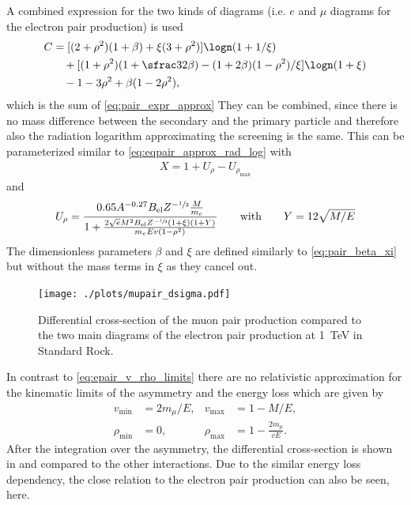 A combined expression for the two kinds of diagrams (i.e. $e$ and $\mu$ diagrams for the electron pair production) is used
\begin{align}
    C &= [(2 + \rho^2)(1 + \beta) + \xi(3 + \rho^2)] \logn (1 + 1/\xi) \\
        & \quad + [(1 + \rho^2)(1 + \sfrac32 \beta) - (1 + 2\beta)(1 - \rho^2)/\xi] \logn(1 + \xi) \\
        & \quad - 1 - 3\rho^2 + \beta(1 - 2\rho^2) ,
\end{align}
which is the sum of \eqref{eq:pair_expr_approx}
They can be combined, since there is no mass difference between the secondary and the primary particle and therefore also the radiation logarithm approximating the screening is the same.
This can be parameterized similar to \eqref{eq:eqpair_approx_rad_log} with
\begin{align}
    X = 1 + U_{\rho} - U_{\rho_{\text{max}}}
\end{align}
and
\begin{align}
    U_\rho = \frac{0.65 A^{-0.27} B_{\text{el}} Z^{-\sfrac13} \frac{M}{m_e}}{1 + \frac{2 \sqrt{e}M^2 B_{\text{el}} Z^{-\sfrac13} (1 + \xi)(1 + Y)}{m_e E v (1 - \rho^2)}}
    \qquad \text{with} \qquad
    Y = 12 \sqrt{M/E}
\end{align}
The dimensionless parameters $\beta$ and $\xi$ are defined similarly to \eqref{eq:pair_beta_xi} but without the mass terms in $\xi$ as they cancel out.
\begin{figure}
    \centering
    \texttt{[image: ./plots/mupair\_dsigma.pdf]}
    \caption{Differential cross-section of the muon pair production compared to the two main diagrams of the electron pair production at \SI{1}{TeV} in Standard Rock.}
    \label{fig:mupair_dsigma}
\end{figure}

In contrast to \eqref{eq:epair_v_rho_limits} there are no relativistic approximation for the kinematic limits of the asymmetry and the energy loss which are given by
\begin{align}
    v_{\min} &= 2 m_\mu / E ,
    & v_{\max} &= 1 - M / E ,
    \\
    \rho_{\min} &= 0 ,
    & \rho_{\max}&= 1 - \frac{2 m_\mu}{vE} .
\end{align}
After the integration over the asymmetry, the differential cross-section is shown in  and compared to the other interactions.
Due to the similar energy loss dependency, the close relation to the electron pair production can also be seen, here.

